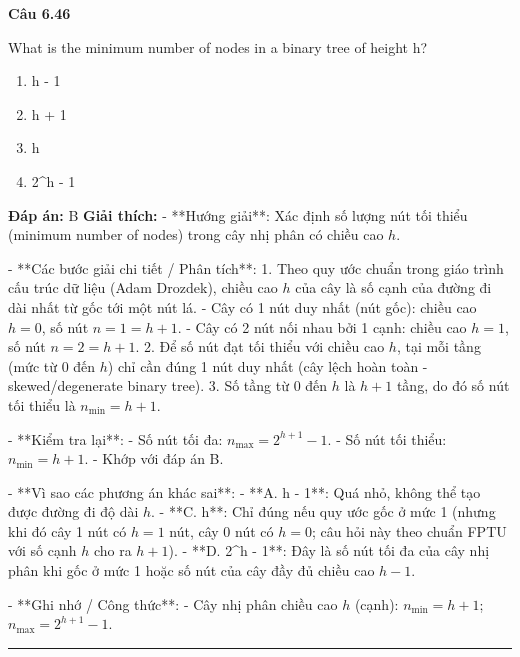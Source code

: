 \documentclass[11pt,a4paper]{article}
\newenvironment{question}[1]{%
  \par\vspace{1em}\noindent\textbf{\large Câu #1}\par\vspace{0.4em}
}{%
  \par\vspace{1em}\hrule\vspace{0.6em}
}
\newenvironment{choices}{%
  \begin{enumerate}[label=\textbf{\Alph*.},leftmargin=2.2em,itemsep=2pt,topsep=3pt]
}{%
  \end{enumerate}
}
\newcommand{\choice}{\item}
\begin{document}
\begin{question}{6.46}
What is the minimum number of nodes in a binary tree of height h?
\begin{choices}
\choice h - 1
\choice h + 1
\choice h
\choice 2^h - 1
\end{choices}
\textbf{Đáp án:} B
\textbf{Giải thích:} - **Hướng giải**:
  Xác định số lượng nút tối thiểu (minimum number of nodes) trong cây nhị phân có chiều cao \(h\).

- **Các bước giải chi tiết / Phân tích**:
  1. Theo quy ước chuẩn trong giáo trình cấu trúc dữ liệu (Adam Drozdek), chiều cao \(h\) của cây là số cạnh của đường đi dài nhất từ gốc tới một nút lá.
     - Cây có 1 nút duy nhất (nút gốc): chiều cao \(h = 0\), số nút \(n = 1 = h + 1\).
     - Cây có 2 nút nối nhau bởi 1 cạnh: chiều cao \(h = 1\), số nút \(n = 2 = h + 1\).
  2. Để số nút đạt tối thiểu với chiều cao \(h\), tại mỗi tầng (mức từ \(0\) đến \(h\)) chỉ cần đúng 1 nút duy nhất (cây lệch hoàn toàn - skewed/degenerate binary tree).
  3. Số tầng từ \(0\) đến \(h\) là \(h + 1\) tầng, do đó số nút tối thiểu là \(n_{\min} = h + 1\).

- **Kiểm tra lại**:
  - Số nút tối đa: \(n_{\max} = 2^{h+1} - 1\).
  - Số nút tối thiểu: \(n_{\min} = h + 1\).
  - Khớp với đáp án B.

- **Vì sao các phương án khác sai**:
  - **A. h - 1**: Quá nhỏ, không thể tạo được đường đi độ dài \(h\).
  - **C. h**: Chỉ đúng nếu quy ước gốc ở mức 1 (nhưng khi đó cây 1 nút có \(h = 1\) nút, cây 0 nút có \(h = 0\); câu hỏi này theo chuẩn FPTU với số cạnh \(h\) cho ra \(h + 1\)).
  - **D. 2^h - 1**: Đây là số nút tối đa của cây nhị phân khi gốc ở mức 1 hoặc số nút của cây đầy đủ chiều cao \(h - 1\).

- **Ghi nhớ / Công thức**:
  - Cây nhị phân chiều cao \(h\) (cạnh): \(n_{\min} = h + 1\); \(n_{\max} = 2^{h+1} - 1\).
\end{question}
\end{document}
